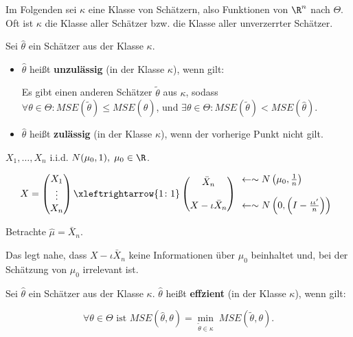 \documentclass{tstextbook}
\begin{document}
Im Folgenden sei $ \kappa $ eine Klasse von Schätzern, also Funktionen von $ \R^n $ nach $ \Theta $. Oft ist $\kappa$ die Klasse aller Schätzer bzw. die Klasse aller unverzerrter Schätzer. 

\begin{definition}
	Sei $ \hat{\theta} $ ein Schätzer aus der Klasse $\kappa$. 
	\begin{itemize}
		\item $\hat{\theta}$ heißt \textbf{unzulässig}  (in der Klasse $\kappa$), wenn gilt: 
		
		Es gibt einen anderen Schätzer $\tilde{\theta}$ aus $\kappa$, sodass $\forall\theta\in\Theta \colon MSE(\tilde{\theta})\le MSE(\hat{\theta}) $, und $ \exists\theta\in\Theta \colon MSE(\tilde{\theta}) < MSE(\hat{\theta}) $.
		\item $ \hat{\theta} $ heißt \textbf{zulässig} (in der Klasse $\kappa$), wenn der vorherige Punkt nicht gilt.
	\end{itemize}
\end{definition}

\begin{example}
	$ X_1,\ldots,X_n $ i.i.d. $ N(\mu_0,1), \; \mu_0 \in \R $. 
	
	\[
	X = \begin{pmatrix}
		X_1 \\ \vdots \\ X_n
	\end{pmatrix} \xleftrightarrow{1\colon1} \begin{pmatrix}
	\bar{X}_n \\ \\ X - \iota\bar{X}_n
\end{pmatrix} \begin{array}{l}
\leftarrow \sim N\left(\mu_0,\frac{1}{n}\right)  \\ \\ \leftarrow \sim N\left(0, \left(I-\frac{\iota\iota^\prime}{n}\right)\right)
\end{array}
	\]
	
	Betrachte $ \hat{\mu} = \bar{X}_n $. 
	
	Das legt nahe, dass $ X-\iota\bar{X}_n $ keine Informationen über $ \mu_0 $ beinhaltet und, bei der Schätzung von $ \mu_0 $ irrelevant ist.
\end{example}

\begin{definition}
	Sei $ \hat{\theta} $ ein Schätzer aus der Klasse $\kappa$. $\hat{\theta}$ heißt \textbf{effzient}  (in der Klasse $\kappa$), wenn gilt:
	
	\[ \forall\theta \in\Theta \text{ ist } MSE\left(\hat{\theta}, \theta\right) = \underset{\tilde{\theta}\in\kappa}{\min}\; MSE\left(\tilde{\theta},\theta\right). \] 
\end{definition}
\end{document}
